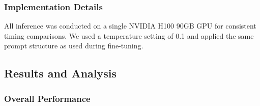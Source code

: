 \documentclass[runningheads]{llncs}
\begin{document}
\subsubsection{Implementation Details}
All inference was conducted on a single NVIDIA H100 90GB GPU for consistent timing comparisons. We used a temperature setting of 0.1 and applied the same prompt structure as used during fine-tuning. %

\subsection{Results and Analysis}

\subsubsection{Overall Performance}
\end{document}
